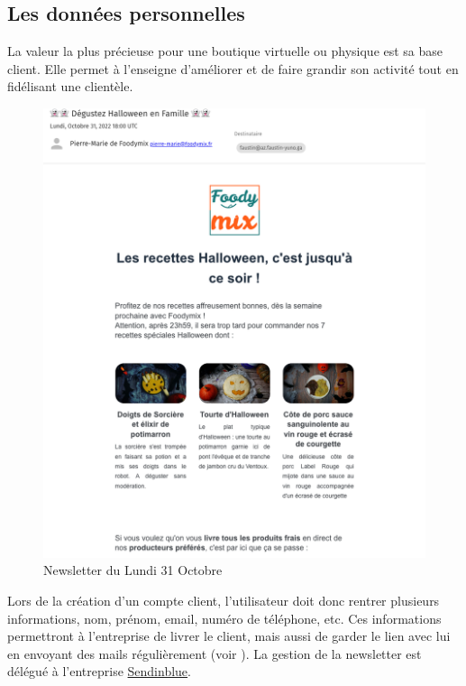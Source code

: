 \documentclass{article}
\begin{document}
\subsection{Les données personnelles}
La valeur la plus précieuse pour une boutique virtuelle ou physique est sa base client. Elle permet à l'enseigne d'améliorer et de faire grandir son activité tout en fidélisant une clientèle.

\begin{figure}[p]
    \centering
    \includegraphics[width=0.8\linewidth]{images/email_foodymix.png}
    \caption{Newsletter du Lundi 31 Octobre}
    \label{Figure Newsletter}
\end{figure}
Lors de la création d'un compte client, l'utilisateur doit donc rentrer plusieurs informations, nom, prénom, email, numéro de téléphone, etc. Ces informations permettront à l'entreprise de livrer le client, mais aussi de garder le lien avec lui en envoyant des mails régulièrement (voir ). La gestion de la newsletter est délégué à l'entreprise \href{https://fr.sendinblue.com}{Sendinblue}.
\pagebreak
\end{document}
